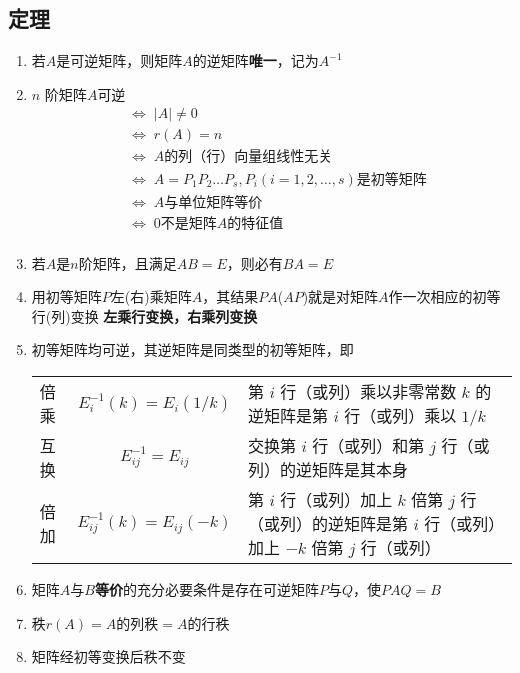 \documentclass[a4paper,12pt]{article}
\begin{document}
    \subsection{定理}

    \begin{enumerate}
        \item 若$A$是可逆矩阵，则矩阵$A$的逆矩阵\textbf{唯一}，记为$A^{-1}$
        \item $n$ 阶矩阵$A$可逆
        \begin{align*}
            &\Leftrightarrow\; |A| \neq 0  \\
            &\Leftrightarrow\; r(A) = n  \\
            &\Leftrightarrow\; A \text{的列（行）向量组线性无关}  \\
            &\Leftrightarrow\; A = P_{1}P_{2}\dots P_{s}, P_{i}(i = 1,2,\dots,s)\text{是初等矩阵}  \\
            &\Leftrightarrow\; A \text{与单位矩阵等价}  \\
            &\Leftrightarrow\; 0\text{不是矩阵} A \text{的特征值}  \\
        \end{align*}
        \item 若$A$是$n$阶矩阵，且满足$AB = E$，则必有$BA = E$
        \item 用初等矩阵$P$左(右)乘矩阵$A$，其结果$PA$($AP$)就是对矩阵$A$作一次相应的初等行(列)变换 \; \Rightarrow \textbf{左乘行变换，右乘列变换}
        \item 初等矩阵均可逆，其逆矩阵是同类型的初等矩阵，即

        \renewcommand{\arraystretch}{1.2}  %
        \begin{tabularx}{\textwidth}{l c >{\raggedright\arraybackslash}X}
            倍乘 & $E_i^{-1}(k) = E_i(1/k)$      & 第 $i$ 行（或列）乘以非零常数 $k$ 的逆矩阵是第 $i$ 行（或列）乘以 $1/k$                     \\
            互换 & $E_{ij}^{-1} = E_{ij}$        & 交换第 $i$ 行（或列）和第 $j$ 行（或列）的逆矩阵是其本身                                  \\
            倍加 & $E_{ij}^{-1}(k) = E_{ij}(-k)$ & 第 $i$ 行（或列）加上 $k$ 倍第 $j$ 行（或列）的逆矩阵是第 $i$ 行（或列）加上 $-k$ 倍第 $j$ 行（或列） \\
        \end{tabularx}
        \item 矩阵$A$与$B$\textbf{等价}的充分必要条件是存在可逆矩阵$P$与$Q$，使$PAQ = B$
        \item 秩$r(A) = A \text{的列秩} = A \text{的行秩}$
        \item 矩阵经初等变换后秩不变
    \end{enumerate}
\end{document}
